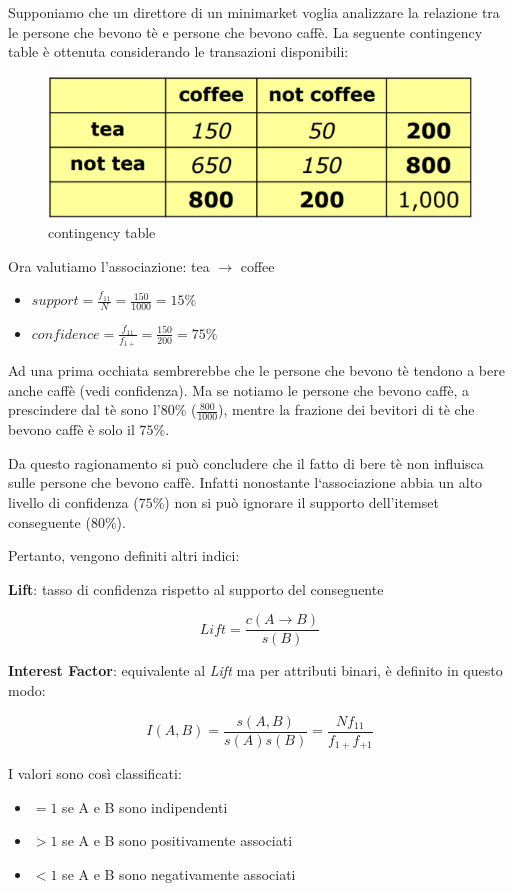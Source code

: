Supponiamo che un direttore di un minimarket voglia analizzare la relazione tra le persone che bevono tè e persone che bevono caffè. La seguente contingency table è ottenuta considerando le transazioni disponibili:
\begin{figure}[H]
	\centering
	\includegraphics[height=0.2 \linewidth]{association/pict/contingency_table_es.png}
	\caption{contingency table}
\end{figure}

Ora valutiamo l'associazione: tea $\rightarrow$ coffee
\begin{itemize}
	\item $support = \frac{f_{11}}{N} = \frac{150}{1000} = 15\%$
	\item $confidence = \frac{f_{11}}{f_{1+}} = \frac{150}{200} = 75\%$
\end{itemize}

Ad una prima occhiata sembrerebbe che le persone che bevono tè tendono a bere anche caffè (vedi confidenza). Ma se notiamo le persone che bevono caffè, a prescindere dal tè sono l'$80\%$ ($\frac{800}{1000}$), mentre la frazione dei bevitori di tè che bevono caffè è solo il $75\%$.

Da questo ragionamento si può concludere che il fatto di bere tè non influisca sulle persone che bevono caffè. Infatti nonostante l`associazione abbia un alto livello di confidenza ($75\%$) non si può ignorare il supporto dell'itemset conseguente ($80\%$).

Pertanto, vengono definiti altri indici:
\begin{defn}
	\textbf{Lift}: tasso di confidenza rispetto al supporto del conseguente
	
	\[ Lift = \frac{c(A \rightarrow B)}{s(B)}\]
\end{defn}

\begin{defn}
	\textbf{Interest Factor}: equivalente al \textit{Lift} ma per attributi binari, è definito in questo modo:
	
	\[ I(A,B)  = \frac{s(A,B)}{s(A)s(B)} = \frac{Nf_{11}}{f_{1+}f_{+1}}\]
\end{defn}
I valori sono così classificati:
\begin{itemize}
	\item $=1$ se A e B sono indipendenti
	\item $>1$ se A e B sono positivamente associati
	\item $<1$ se A e B sono negativamente associati
\end{itemize}
	
